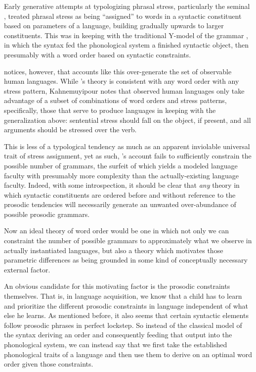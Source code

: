 \documentclass{article}
\begin{document}

Early generative attempts at typologizing phrasal stress, particularly the seminal \textcite{halle87}, treated phrasal stress as being ``assigned'' to words in a syntactic constituent based on parameters of a language, building gradually upwards to larger constituents.
This was in keeping with the traditional Y-model of the grammar \parencite{chomsky65}, in which the syntax fed the phonological system a finished syntactic object, then presumably with a word order based on syntactic constraints.

\textcite{kahnemuyipour05} notices, however, that accounts like this over-generate the set of observable human languages.
While \textcite{halle87}'s theory is consistent with any word order with any stress pattern, Kahnemuyipour notes that observed human languages only take advantage of a subset of combinations of word orders and stress patterns, specifically, those that serve to produce languages in keeping with the generalization above: sentential stress should fall on the object, if present, and all arguments should be stressed over the verb.

This is less of a typological tendency as much as an apparent inviolable universal trait of stress assignment, yet as such, \textcite{halle87}'s account fails to sufficiently constrain the possible number of grammars, the surfeit of which yields a modeled language faculty with presumably more complexity than the actually-existing language faculty.
Indeed, with some introspection, it should be clear that \emph{any} theory in which syntactic constituents are ordered before and without reference to the prosodic tendencies will necessarily generate an unwanted over-abundance of possible prosodic grammars.

Now an ideal theory of word order would be one in which not only we can constraint the number of possible grammars to approximately what we observe in actually instantiated languages, but also a theory which motivates those parametric differences as being grounded in some kind of conceptually necessary external factor.

An obvious candidate for this motivating factor is the prosodic constraints themselves.
That is, in language acquisition, we know that a child has to learn and prioritize the different prosodic constraints in language independent of what else he learns.
As mentioned before, it also seems that certain syntactic elements follow prosodic phrases in perfect lockstep.
So instead of the classical model of the syntax deriving an order and consequently feeding that output into the phonological system, we can instead say that we first take the established phonological traits of a language and then use them to derive on an optimal word order given those constraints.
\end{document}
